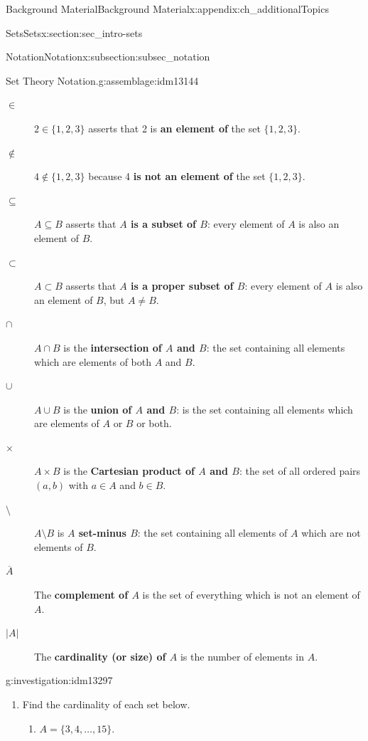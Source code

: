 \documentclass[oneside,10pt,]{book}
\newcommand{\terminology}[1]{\textbf{#1}}
\numberwithin{equation}{chapter}
\newcommand{\card}[1]{\left| #1 \right|}
\begin{document}
\begin{appendixptx}{Background Material}{}{Background Material}{}{}{x:appendix:ch_additionalTopics}
\begin{sectionptx}{Sets}{}{Sets}{}{}{x:section:sec_intro-sets}
\begin{subsectionptx}{Notation}{}{Notation}{}{}{x:subsection:subsec_notation}
\begin{assemblage}{Set Theory Notation.}{g:assemblage:idm13144}
\begin{description}
\item[{\(\in\)}]\(2 \in \{1,2,3\}\) asserts that 2 is \terminology{an element of} the set \(\{1,2,3\}\). \label{g:notation:idm13176}%
\item[{\(\not\in\)}]\(4 \notin \{1,2,3\}\) because 4 \terminology{is not an element of} the set \(\{1,2,3\}\).%
\item[{\(\subseteq\)}]\(A \subseteq B\) asserts that \terminology{\(A\) is a subset of \(B\)}: every element of \(A\) is also an element of \(B\).      \label{g:notation:idm13197}%
\item[{\(\subset\)}]\(A \subset B\) asserts that  \terminology{\(A\) is a proper subset of \(B\)}: every element of \(A\) is also an element of \(B\), but \(A \ne B\).\label{g:notation:idm13212}%
\item[{\(\cap\)}]\(A \cap B\) is the \terminology{intersection of \(A\) and \(B\)}: the set containing all elements which are elements of both \(A\) and \(B\). \label{g:notation:idm13226}%
\item[{\(\cup\)}]\(A \cup B\) is the \terminology{union of \(A\) and \(B\)}: is the set containing all elements which are elements of \(A\) or \(B\) or both.\label{g:notation:idm13241}%
\item[{\(\times\)}]\(A \times B\) is the \terminology{Cartesian product of \(A\) and   \(B\)}: the set of all ordered pairs \((a,b)\) with \(a \in A\) and \(b \in B\).\label{g:notation:idm13257}%
\item[{\(\setminus\)}]\(A \setminus B\) is \terminology{\(A\) set-minus \(B\)}: the set containing all elements of \(A\) which are not elements of \(B\).\label{g:notation:idm13270}%
\item[{\(\overline{A}\)}]The \terminology{complement of \(A\)} is the set of everything which is not an element of \(A\). \label{g:notation:idm13280}%
\item[{\(\card{A}\)}]The \terminology{cardinality (or size) of \(A\)} is the number of elements in \(A\).\label{g:notation:idm13291} %
\end{description}
%
\end{assemblage}
\begin{investigation}{}{g:investigation:idm13297}%
%
\begin{enumerate}
\item{}Find the cardinality of each set below.%
\begin{enumerate}
\item{}\(A = \{3,4,\ldots, 15\}\).%

\end{enumerate}
\end{enumerate}
\end{investigation}
\end{subsectionptx}
\end{sectionptx}
\end{appendixptx}
\end{document}
